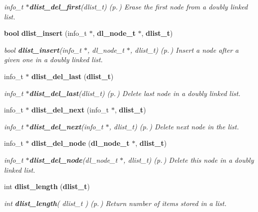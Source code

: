 \begin{CompactItemize}
\begin{CompactList}\small\item\em info\_\-t $\ast${\bf dlist\_\-del\_\-first}(dlist\_\-t) {\rm (p.\,\pageref{P__dlist_8h_a4})} Erase the first node from a doubly linked list.\item\end{CompactList}\item 
{\bf bool} {\bf dlist\_\-insert} (info\_\-t $\ast$, {\bf dl\_\-node\_\-t} $\ast$, {\bf dlist\_\-t})
\begin{CompactList}\small\item\em bool {\bf dlist\_\-insert}(info\_\-t $\ast$, dl\_\-node\_\-t $\ast$, dlist\_\-t) {\rm (p.\,\pageref{P__dlist_8h_a5})} Insert a node after a given one in a doubly linked list.\item\end{CompactList}\item 
info\_\-t $\ast$ {\bf dlist\_\-del\_\-last} ({\bf dlist\_\-t})
\begin{CompactList}\small\item\em info\_\-t $\ast${\bf dlist\_\-del\_\-last}(dlist\_\-t) {\rm (p.\,\pageref{P__dlist_8h_a6})} Delete last node in a doubly linked list.\item\end{CompactList}\item 
info\_\-t $\ast$ {\bf dlist\_\-del\_\-next} (info\_\-t $\ast$, {\bf dlist\_\-t})
\begin{CompactList}\small\item\em info\_\-t $\ast${\bf dlist\_\-del\_\-next}(info\_\-t $\ast$, dlist\_\-t) {\rm (p.\,\pageref{P__dlist_8h_a7})} Delete next node in the list.\item\end{CompactList}\item 
info\_\-t $\ast$ {\bf dlist\_\-del\_\-node} ({\bf dl\_\-node\_\-t} $\ast$, {\bf dlist\_\-t})
\begin{CompactList}\small\item\em info\_\-t $\ast${\bf dlist\_\-del\_\-node}(dl\_\-node\_\-t $\ast$, dlist\_\-t) {\rm (p.\,\pageref{P__dlist_8h_a8})} Delete this node in a doubly linked list.\item\end{CompactList}\item 
int {\bf dlist\_\-length} ({\bf dlist\_\-t})
\begin{CompactList}\small\item\em int {\bf dlist\_\-length}( dlist\_\-t ) {\rm (p.\,\pageref{P__dlist_8h_a9})} Return number of items stored in a list.\item\end{CompactList}\item 

\end{CompactItemize}
